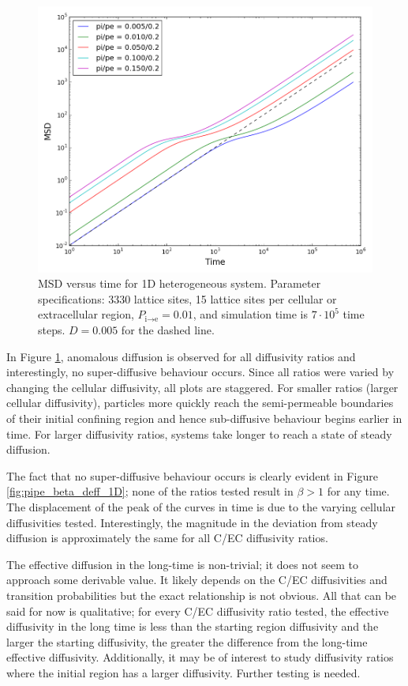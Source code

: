 	\begin{figure}[h!]
		\centering
		\includegraphics[width=1.0\linewidth]{../images/1D/pipe_msd_1D}
		\caption[1D: MSD for varying diffusivities]{MSD versus time for 1D heterogeneous system. Parameter specifications: 3330 lattice sites, 15 lattice sites per cellular or extracellular region, $ P_{\textrm{i} \rightarrow \textrm{e}} = 0.01 $, and simulation time is $ 7\cdot 10^5 $ time steps. $ D = 0.005 $ for the dashed line.}
		\label{fig:pipe_msd_1D}
	\end{figure}
	
	In Figure \ref{fig:pipe_msd_1D}, anomalous diffusion is observed for all diffusivity ratios and interestingly, no super-diffusive behaviour occurs. Since all ratios were varied by changing the cellular diffusivity, all plots are staggered. For smaller ratios (larger cellular diffusivity), particles more quickly reach the semi-permeable boundaries of their initial confining region and hence sub-diffusive behaviour begins earlier in time. For larger diffusivity ratios, systems take longer to reach a state of steady diffusion.
	
	The fact that no super-diffusive behaviour occurs is clearly evident in Figure \ref{fig:pipe_beta_deff_1D}; none of the ratios tested result in $ \beta > 1 $ for any time. The displacement of the peak of the curves in time is due to the varying cellular diffusivities tested. Interestingly, the magnitude in the deviation from steady diffusion is approximately the same for all C/EC diffusivity ratios. 
	
	The effective diffusion in the long-time is non-trivial; it does not seem to approach some derivable value. It likely depends on the C/EC diffusivities and transition probabilities but the exact relationship is not obvious. All that can be said for now is qualitative; for every C/EC diffusivity ratio tested, the effective diffusivity in the long time is less than the starting region diffusivity and the larger the starting diffusivity, the greater the difference from the long-time effective diffusivity. Additionally, it may be of interest to study diffusivity ratios where the initial region has a larger diffusivity. Further testing is needed.
	
